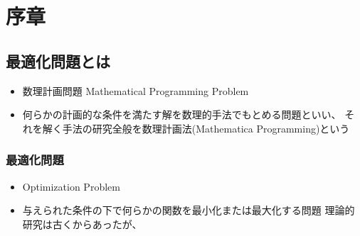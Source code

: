 \section{序章}\label{ux5e8fux7ae0}

\subsection{最適化問題とは}\label{ux6700ux9069ux5316ux554fux984cux3068ux306f}

\begin{itemize}
\tightlist
\item
  数理計画問題 Mathematical Programming Problem
\item
  何らかの計画的な条件を満たす解を数理的手法でもとめる問題といい、
  それを解く手法の研究全般を数理計画法(Mathematica Programming)という
\end{itemize}

\subsubsection{最適化問題}\label{ux6700ux9069ux5316ux554fux984c}

\begin{itemize}
\tightlist
\item
  Optimization Problem
\item
  与えられた条件の下で何らかの関数を最小化または最大化する問題
  理論的研究は古くからあったが、
\end{itemize}
